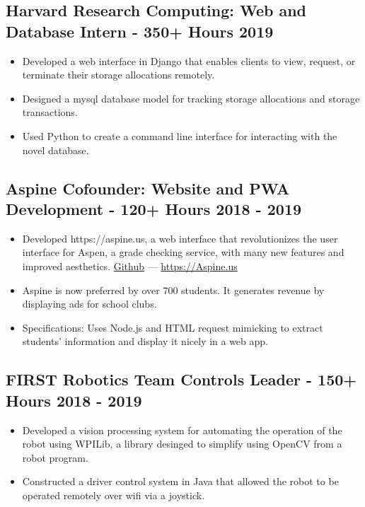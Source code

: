 \documentclass{article}
\begin{document}
\subsection{Harvard Research Computing: Web and Database Intern - 350+ Hours \hfill 2019}
\begin{itemize}[leftmargin=0.5in]
  \setlength\itemsep{0.00em}
  \item Developed a web interface in Django that enables clients to view, request, or terminate their storage allocations remotely.
  \item Designed a mysql database model for tracking storage allocations and storage transactions.
  \item Used Python to create a command line interface for interacting with the novel database.
\end{itemize}

\subsection{Aspine Cofounder: Website and PWA Development - 120+ Hours \hfill 2018 - 2019}
\begin{itemize}[leftmargin=0.5in]
  \setlength\itemsep{0.00em}
  \item Developed https://aspine.us, a web interface that revolutionizes the user interface for Aspen, a grade checking service, with many new features and improved aesthetics. \href{https://github.com/Aspine/aspine}{Github} --- \href{https://aspine.us}{https://Aspine.us}
  \item Aspine is now preferred by over 700 students. It generates revenue by displaying ads for school clubs.
  \item Specifications: Uses Node.js and HTML request mimicking to extract students’ information and display it nicely in a web app.
\end{itemize}

\subsection{FIRST Robotics Team Controls Leader - 150+ Hours \hfill 2018 - 2019}
\begin{itemize}[leftmargin=0.5in]
  \setlength\itemsep{0.00em}
  \item Developed a vision processing system for automating the operation of the robot using WPILib, a library desinged to simplify using OpenCV from a robot program.
  \item Constructed a driver control system in Java that allowed the robot to be operated remotely over wifi via a joystick.
\end{itemize}
\end{document}
